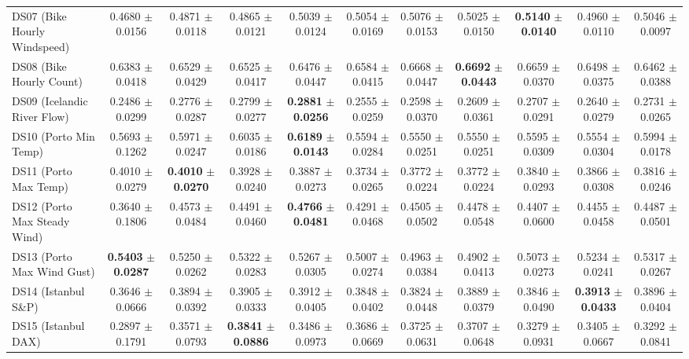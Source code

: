 \begin{table}[t]
{{\begin{tabular}{lcccccccccc}
DS07 (Bike Hourly Windspeed) & 0.4680 $\pm$ 0.0156 & 0.4871 $\pm$ 0.0118 & 0.4865 $\pm$ 0.0121 & 0.5039 $\pm$ 0.0124 & 0.5054 $\pm$ 0.0169 & 0.5076 $\pm$ 0.0153 & 0.5025 $\pm$ 0.0150 & \textbf{0.5140} $\pm$ \textbf{0.0140} & 0.4960 $\pm$ 0.0110 & 0.5046 $\pm$ 0.0097 \\
DS08 (Bike Hourly Count) & 0.6383 $\pm$ 0.0418 & 0.6529 $\pm$ 0.0429 & 0.6525 $\pm$ 0.0417 & 0.6476 $\pm$ 0.0447 & 0.6584 $\pm$ 0.0415 & 0.6668 $\pm$ 0.0447 & \textbf{0.6692} $\pm$ \textbf{0.0443} & 0.6659 $\pm$ 0.0370 & 0.6498 $\pm$ 0.0375 & 0.6462 $\pm$ 0.0388 \\
DS09 (Icelandic River Flow) & 0.2486 $\pm$ 0.0299 & 0.2776 $\pm$ 0.0287 & 0.2799 $\pm$ 0.0277 & \textbf{0.2881} $\pm$ \textbf{0.0256} & 0.2555 $\pm$ 0.0259 & 0.2598 $\pm$ 0.0370 & 0.2609 $\pm$ 0.0361 & 0.2707 $\pm$ 0.0291 & 0.2640 $\pm$ 0.0279 & 0.2731 $\pm$ 0.0265 \\
DS10 (Porto Min Temp) & 0.5693 $\pm$ 0.1262 & 0.5971 $\pm$ 0.0247 & 0.6035 $\pm$ 0.0186 & \textbf{0.6189} $\pm$ \textbf{0.0143} & 0.5594 $\pm$ 0.0284 & 0.5550 $\pm$ 0.0251 & 0.5550 $\pm$ 0.0251 & 0.5595 $\pm$ 0.0309 & 0.5554 $\pm$ 0.0304 & 0.5994 $\pm$ 0.0178 \\
DS11 (Porto Max Temp) & 0.4010 $\pm$ 0.0279 & \textbf{0.4010} $\pm$ \textbf{0.0270} & 0.3928 $\pm$ 0.0240 & 0.3887 $\pm$ 0.0273 & 0.3734 $\pm$ 0.0265 & 0.3772 $\pm$ 0.0224 & 0.3772 $\pm$ 0.0224 & 0.3840 $\pm$ 0.0293 & 0.3866 $\pm$ 0.0308 & 0.3816 $\pm$ 0.0246 \\
DS12 (Porto Max Steady Wind) & 0.3640 $\pm$ 0.1806 & 0.4573 $\pm$ 0.0484 & 0.4491 $\pm$ 0.0460 & \textbf{0.4766} $\pm$ \textbf{0.0481} & 0.4291 $\pm$ 0.0468 & 0.4505 $\pm$ 0.0502 & 0.4478 $\pm$ 0.0548 & 0.4407 $\pm$ 0.0600 & 0.4455 $\pm$ 0.0458 & 0.4487 $\pm$ 0.0501 \\
DS13 (Porto Max Wind Gust) & \textbf{0.5403} $\pm$ \textbf{0.0287} & 0.5250 $\pm$ 0.0262 & 0.5322 $\pm$ 0.0283 & 0.5267 $\pm$ 0.0305 & 0.5007 $\pm$ 0.0274 & 0.4963 $\pm$ 0.0384 & 0.4902 $\pm$ 0.0413 & 0.5073 $\pm$ 0.0273 & 0.5234 $\pm$ 0.0241 & 0.5317 $\pm$ 0.0267 \\
DS14 (Istanbul S\&P) & 0.3646 $\pm$ 0.0666 & 0.3894 $\pm$ 0.0392 & 0.3905 $\pm$ 0.0333 & 0.3912 $\pm$ 0.0405 & 0.3848 $\pm$ 0.0402 & 0.3824 $\pm$ 0.0448 & 0.3889 $\pm$ 0.0379 & 0.3846 $\pm$ 0.0490 & \textbf{0.3913} $\pm$ \textbf{0.0433} & 0.3896 $\pm$ 0.0404 \\
DS15 (Istanbul DAX) & 0.2897 $\pm$ 0.1791 & 0.3571 $\pm$ 0.0793 & \textbf{0.3841} $\pm$ \textbf{0.0886} & 0.3486 $\pm$ 0.0973 & 0.3686 $\pm$ 0.0669 & 0.3725 $\pm$ 0.0631 & 0.3707 $\pm$ 0.0648 & 0.3279 $\pm$ 0.0931 & 0.3405 $\pm$ 0.0667 & 0.3292 $\pm$ 0.0841 \\

\end{tabular}}}
\end{table}
